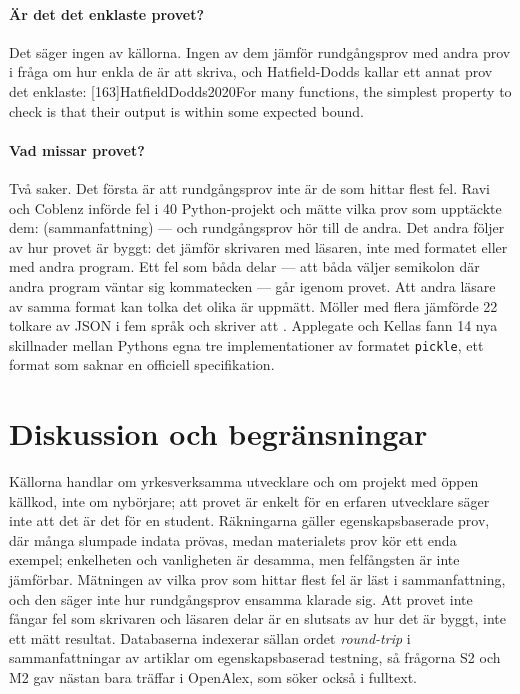 \paragraph{Är det det enklaste provet?}  Det säger ingen av källorna.
Ingen av dem jämför rundgångsprov med andra prov i fråga om hur enkla
de är att skriva, och Hatfield-Dodds kallar ett annat prov det enklaste:
[163]{HatfieldDodds2020}{For many functions,
the simplest property to check is that their output is within some
expected bound}.

\paragraph{Vad missar provet?}  Två saker.  Det första är att
rundgångsprov inte är de som hittar flest fel.  Ravi och Coblenz
införde fel i 40 Python-projekt och mätte vilka prov som upptäckte dem:
(sammanfattning) --- och rundgångsprov hör till de andra.  Det andra
följer av hur provet är byggt: det jämför skrivaren med läsaren, inte
med formatet eller med andra program.  Ett fel som båda delar --- att
båda väljer semikolon där andra program väntar sig kommatecken --- går
igenom provet.  Att andra läsare av samma format kan tolka det olika är
uppmätt.  Möller med flera jämförde 22 tolkare av JSON i fem språk och
skriver att .  Applegate och Kellas fann 14 nya
skillnader mellan Pythons egna tre implementationer av formatet
\texttt{pickle}, ett format som saknar en officiell
specifikation\autocite{Applegate2026Pickle}.

\section{Diskussion och begränsningar}
\label{sec:rg-diskussion}

Källorna handlar om yrkesverksamma utvecklare och om projekt med öppen
källkod, inte om nybörjare; att provet är enkelt för en erfaren
utvecklare säger inte att det är det för en student.  Räkningarna gäller
egenskapsbaserade prov, där många slumpade indata prövas, medan
materialets prov kör ett enda exempel; enkelheten och vanligheten är
desamma, men felfångsten är inte jämförbar.  Mätningen av vilka prov som
hittar flest fel är läst i sammanfattning, och den säger inte hur
rundgångsprov ensamma klarade sig.  Att provet inte fångar fel som
skrivaren och läsaren delar är en slutsats av hur det är byggt, inte ett
mätt resultat.  Databaserna indexerar sällan ordet \emph{round-trip} i
sammanfattningar av artiklar om egenskapsbaserad testning, så frågorna
S2 och M2 gav nästan bara träffar i OpenAlex, som söker också i
fulltext.

